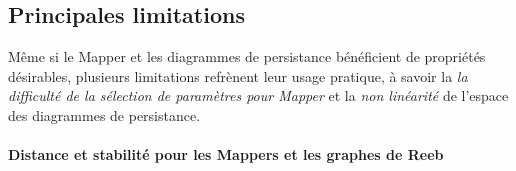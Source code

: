 

\subsection{Principales limitations}

M\^eme si le Mapper et les diagrammes de persistance b\'en\'eficient de propri\'et\'es d\'esirables, plusieurs limitations
refr\`enent leur usage pratique, \`a savoir la {\em la difficult\'e de la s\'election de param\`etres pour Mapper}
 et la {\em non lin\'earit\'e} de l'espace des diagrammes de persistance.





\paragraph*{Distance et stabilit\'e pour les Mappers et les graphes de Reeb}

%

